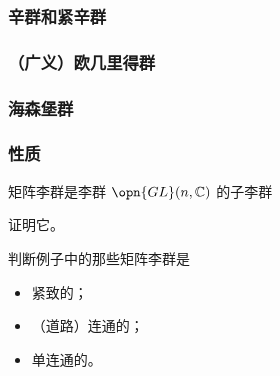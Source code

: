 
\subsubsection{辛群和紧辛群}

\subsubsection{（广义）欧几里得群}

\subsubsection{海森堡群}

\subsubsection{性质}

\begin{theorem}{}
矩阵李群是李群 $\opn{GL}(n, \mathbb{C})$ 的子李群
\end{theorem}

\begin{exercise}{}
证明它。
\end{exercise}

\begin{exercise}{}
判断例子中的那些矩阵李群是
\begin{itemize}
\item 紧致的；
\item （道路）连通的；
\item 单连通的。
\end{itemize}
\end{exercise}

